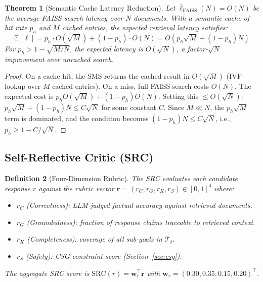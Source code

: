 \documentclass[10pt,conference]{IEEEtran}
\theoremstyle{ieeethm}
\newtheorem{theorem}{Theorem}
\theoremstyle{ieeedef}
\newtheorem{definition}[theorem]{Definition}
\theoremstyle{ieeeremark}
\begin{document}
\begin{theorem}[Semantic Cache Latency Reduction]
\label{thm:cache_latency}
Let $\bar{\ell}_\text{FAISS}(N) = O(N)$ be the average FAISS search latency over $N$ documents. With a semantic cache of hit rate $p_h$ and $M$ cached entries, the expected retrieval latency satisfies:
\begin{equation}
\mathbb{E}[\ell] = p_h \cdot O(\sqrt{M}) + (1-p_h) \cdot O(N) = O\!\left(p_h \sqrt{M} + (1-p_h) N\right)
\label{eq:cache_latency}
\end{equation}
For $p_h > 1 - \sqrt{M/N}$, the expected latency is $O(\sqrt{N})$, a factor-$\sqrt{N}$ improvement over uncached search.
\end{theorem}
\begin{proof}
On a cache hit, the SMS returns the cached result in $O(\sqrt{M})$ (IVF lookup over $M$ cached entries). On a miss, full FAISS search costs $O(N)$. The expected cost is $p_h O(\sqrt{M}) + (1-p_h) O(N)$. Setting this $\leq O(\sqrt{N})$: $p_h \sqrt{M} + (1-p_h) N \leq C\sqrt{N}$ for some constant $C$. Since $M \ll N$, the $p_h \sqrt{M}$ term is dominated, and the condition becomes $(1-p_h)N \leq C\sqrt{N}$, i.e., $p_h \geq 1 - C/\sqrt{N}$.
\end{proof}

\subsection{Self-Reflective Critic (SRC)}
\label{sec:src}

\begin{definition}[Four-Dimension Rubric]
\label{def:rubric}
The SRC evaluates each candidate response $r$ against the rubric vector $\mathbf{r} = (r_C, r_G, r_K, r_S) \in [0,1]^4$ where:
\begin{itemize}[nosep]
  \item $r_C$ (Correctness): LLM-judged factual accuracy against retrieved documents.
  \item $r_G$ (Groundedness): fraction of response claims traceable to retrieved context.
  \item $r_K$ (Completeness): coverage of all sub-goals in $\mathcal{T}_t$.
  \item $r_S$ (Safety): CSG constraint score (Section~\ref{sec:csg}).
\end{itemize}
The aggregate SRC score is $\text{SRC}(r) = \mathbf{w}_r^\top \mathbf{r}$ with $\mathbf{w}_r = (0.30, 0.35, 0.15, 0.20)^\top$.
\end{definition}
\end{document}
